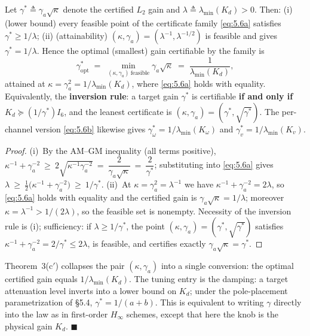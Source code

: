\renewcommand{\thetheorem}{3(c$'$)}%
\begin{theorem}\label{thm:3c2}
Let $\gamma^{*}\triangleq\gamma_a\sqrt{\kappa}$ denote the certified $L_2$ gain and $\lambda\triangleq\lambda_{\min}(K_d)>0$. Then:
(i) (lower bound) every feasible point of the certificate family \eqref{eq:5.6a} satisfies $\gamma^{*}\ge1/\lambda$;
(ii) (attainability) $(\kappa,\gamma_a)=(\lambda^{-1},\lambda^{-1/2})$ is feasible and gives $\gamma^{*}=1/\lambda$.
Hence the optimal (smallest) gain certifiable by the family is
\begin{equation}
\gamma^{*}_{\mathrm{opt}}\;=\;\min_{(\kappa,\gamma_a)\ \mathrm{feasible}}\gamma_a\sqrt{\kappa}\;=\;\frac{1}{\lambda_{\min}(K_d)} ,
\tag{5.6c}\label{eq:5.6c}
\end{equation}
attained at $\kappa=\gamma_a^2=1/\lambda_{\min}(K_d)$, where \eqref{eq:5.6a} holds with equality. Equivalently, the \textbf{inversion rule}: a target gain $\gamma^{*}$ is certifiable \textbf{if and only if} $K_d\succeq(1/\gamma^{*})I_6$, and the leanest certificate is $(\kappa,\gamma_a)=(\gamma^{*},\sqrt{\gamma^{*}})$. The per-channel version \eqref{eq:5.6b} likewise gives $\gamma^{*}_\omega=1/\lambda_{\min}(K_\omega)$ and $\gamma^{*}_v=1/\lambda_{\min}(K_v)$.
\end{theorem}

\begin{proof}
(i)~By the AM--GM inequality (all terms positive),
$\kappa^{-1}+\gamma_a^{-2}\ \ge\ 2\sqrt{\kappa^{-1}\gamma_a^{-2}}\ =\ \dfrac{2}{\gamma_a\sqrt{\kappa}}\ =\ \dfrac{2}{\gamma^{*}}$;
substituting into \eqref{eq:5.6a} gives $\lambda\ \ge\ \tfrac12\bigl(\kappa^{-1}+\gamma_a^{-2}\bigr)\ \ge\ 1/\gamma^{*}$.
(ii)~At $\kappa=\gamma_a^2=\lambda^{-1}$ we have $\kappa^{-1}+\gamma_a^{-2}=2\lambda$, so \eqref{eq:5.6a} holds with equality and the certified gain is $\gamma_a\sqrt{\kappa}=1/\lambda$; moreover $\kappa=\lambda^{-1}>1/(2\lambda)$, so the feasible set is nonempty.
Necessity of the inversion rule is (i); sufficiency: if $\lambda\ge1/\gamma^{*}$, the point $(\kappa,\gamma_a)=(\gamma^{*},\sqrt{\gamma^{*}})$ satisfies $\kappa^{-1}+\gamma_a^{-2}=2/\gamma^{*}\le2\lambda$, is feasible, and certifies exactly $\gamma_a\sqrt{\kappa}=\gamma^{*}$.
\end{proof}

\begin{remark}
Theorem~3(c$'$) collapses the pair $(\kappa,\gamma_a)$ into a single conversion: the optimal certified gain equals $1/\lambda_{\min}(K_d)$. The tuning entry is the damping: a target attenuation level inverts into a lower bound on $K_d$; under the pole-placement parametrization of \S5.4, $\gamma^{*}=1/(a+b)$. This is equivalent to writing $\gamma$ directly into the law as in first-order $H_\infty$ schemes, except that here the knob is the physical gain $K_d$. $\blacksquare$
\end{remark}

